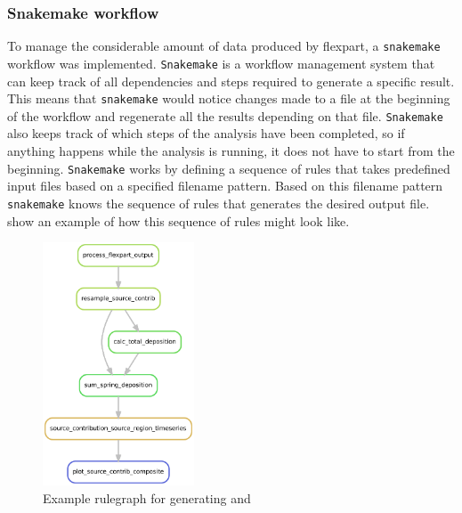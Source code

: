 \subsubsection{Snakemake workflow}
To manage the considerable amount of data produced by \acrshort{flexpart}, a \verb|snakemake| workflow was implemented.   
\verb|Snakemake| is a workflow management system \parencite{molder2021sustainable} that can keep track of all dependencies and steps required to generate a specific result.
This means that \verb|snakemake| would notice changes made to a file at the beginning of the workflow and regenerate all the results depending on that file. 
\verb|Snakemake| also keeps track of which steps of the analysis have been completed, so if anything happens while the analysis is running, it does not have to start from the beginning. 
\verb|Snakemake| works by defining a sequence of rules that takes predefined input files based on a specified filename pattern. 
Based on this filename pattern \verb|snakemake| knows the sequence of rules that generates the desired output file.  show an example of how this sequence of rules might look like.  
 \begin{figure}[htpb]
     \centering
     \includegraphics[width=0.4\textwidth]{texfiles/figs/rulegraph_eks.pdf}
     \caption{Example rulegraph for generating  and }
     \label{fig:rule_graph_eks}
 \end{figure}  

